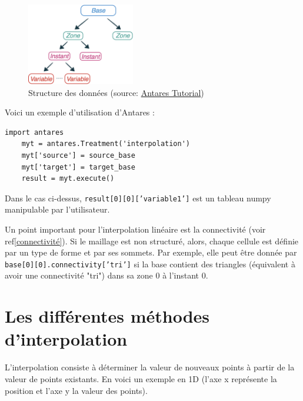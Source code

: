 \begin{figure}[H]
\centering
\includegraphics[width=0.42\textwidth]{images/data_structure_1.png}
\caption{Structure des données (source: \href{https://cerfacs.fr/antares/src/tutorial/base.html}{Antares Tutorial})}
\label{fig:structure_antares}
\end{figure}

Voici un exemple d'utilisation d'Antares :

\begin{lstlisting}[caption=Exemple simple d'utilisation d'Antares pour interpoler, label={lst:antares_2}]
    import antares
    myt = antares.Treatment('interpolation')
    myt['source'] = source_base
    myt['target'] = target_base
    result = myt.execute()
\end{lstlisting}

Dans le cas ci-dessus, \texttt{result[0][0]['variable1']} est un tableau numpy manipulable par l'utilisateur.

Un point important pour l'interpolation linéaire est la connectivité (voir ref\ref{connectivité}). Si le maillage est non structuré, alors, chaque cellule est définie par un type de forme et par ses sommets. Par exemple, elle peut être donnée par \texttt{base[0][0].connectivity['tri']} si la base contient des triangles (équivalent à avoir une connectivité "tri") dans sa zone 0 à l'instant 0.


\section{Les différentes méthodes d'interpolation}

L'interpolation consiste à déterminer la valeur de nouveaux points à partir de la valeur de points existants. En voici un exemple en \ac{1D} (l'axe x représente la position et l'axe y la valeur des points).

\vspace{0,5cm}


